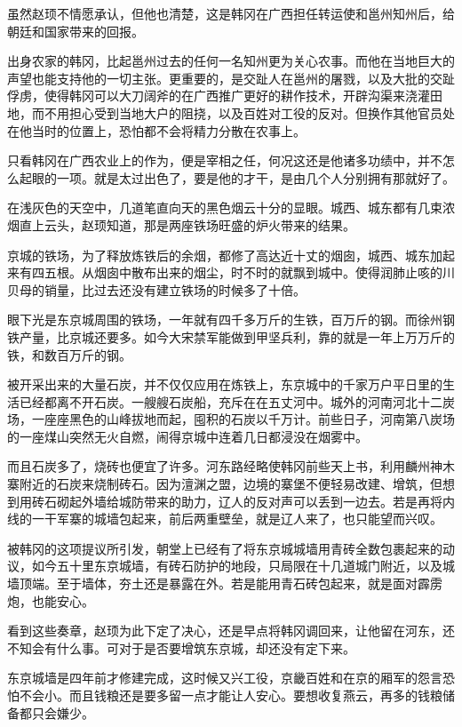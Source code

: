 虽然赵顼不情愿承认，但他也清楚，这是韩冈在广西担任转运使和邕州知州后，给朝廷和国家带来的回报。 

出身农家的韩冈，比起邕州过去的任何一名知州更为关心农事。而他在当地巨大的声望也能支持他的一切主张。更重要的，是交趾人在邕州的屠戮，以及大批的交趾俘虏，使得韩冈可以大刀阔斧的在广西推广更好的耕作技术，开辟沟渠来浇灌田地，而不用担心受到当地大户的阻挠，以及百姓对工役的反对。但换作其他官员处在他当时的位置上，恐怕都不会将精力分散在农事上。 

只看韩冈在广西农业上的作为，便是宰相之任，何况这还是他诸多功绩中，并不怎么起眼的一项。就是太过出色了，要是他的才干，是由几个人分别拥有那就好了。 

在浅灰色的天空中，几道笔直向天的黑色烟云十分的显眼。城西、城东都有几束浓烟直上云头，赵顼知道，那是两座铁场旺盛的炉火带来的结果。 

京城的铁场，为了释放炼铁后的余烟，都修了高达近十丈的烟囱，城西、城东加起来有四五根。从烟囱中散布出来的烟尘，时不时的就飘到城中。使得润肺止咳的川贝母的销量，比过去还没有建立铁场的时候多了十倍。 

眼下光是东京城周围的铁场，一年就有四千多万斤的生铁，百万斤的钢。而徐州钢铁产量，比京城还要多。如今大宋禁军能做到甲坚兵利，靠的就是一年上万万斤的铁，和数百万斤的钢。 

被开采出来的大量石炭，并不仅仅应用在炼铁上，东京城中的千家万户平日里的生活已经都离不开石炭。一艘艘石炭船，充斥在在五丈河中。城外的河南河北十二炭场，一座座黑色的山峰拔地而起，囤积的石炭以千万计。前些日子，河南第八炭场的一座煤山突然无火自燃，闹得京城中连着几日都浸没在烟雾中。 

而且石炭多了，烧砖也便宜了许多。河东路经略使韩冈前些天上书，利用麟州神木寨附近的石炭来烧制砖石。因为澶渊之盟，边境的寨堡不便轻易改建、增筑，但想到用砖石砌起外墙给城防带来的助力，辽人的反对声可以丢到一边去。若是再将内线的一干军寨的城墙包起来，前后两重壁垒，就是辽人来了，也只能望而兴叹。

被韩冈的这项提议所引发，朝堂上已经有了将东京城城墙用青砖全数包裹起来的动议，如今五十里东京城墙，有砖石防护的地段，只局限在十几道城门附近，以及城墙顶端。至于墙体，夯土还是暴露在外。若是能用青石砖包起来，就是面对霹雳炮，也能安心。 

看到这些奏章，赵顼为此下定了决心，还是早点将韩冈调回来，让他留在河东，还不知会有什么事。可对于是否要增筑东京城，却还没有定下来。 

东京城墙是四年前才修建完成，这时候又兴工役，京畿百姓和在京的厢军的怨言恐怕不会小。而且钱粮还是要多留一点才能让人安心。要想收复燕云，再多的钱粮储备都只会嫌少。 

